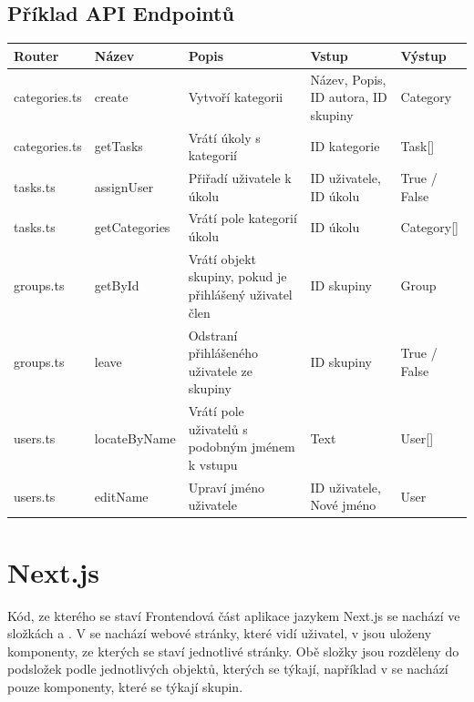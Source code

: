 \subsection{Příklad API Endpointů}
\begin{tabularx}{1\textwidth} { 
	| >{\centering\arraybackslash}X 
	| >{\centering\arraybackslash}X 
	| >{\centering\arraybackslash}X 
	| >{\centering\arraybackslash}X 
	| >{\centering\arraybackslash}X | }
	\hline
	\textbf{Router} & \textbf{Název} & \textbf{Popis}                                                  & \textbf{Vstup}                       & \textbf{Výstup} \\
	\hline
	categories.ts   & create          & Vytvoří kategorii                                             & Název, Popis, ID autora, ID skupiny & Category         \\
	\hline
	categories.ts   & getTasks        & Vrátí úkoly s kategorií                                     & ID kategorie                         & Task[]           \\
	\hline
	tasks.ts        & assignUser      & Přiřadí uživatele k úkolu                                  & ID uživatele, ID úkolu             & True / False     \\
	\hline
	tasks.ts        & getCategories   & Vrátí pole kategorií úkolu                                  & ID úkolu                            & Category[]       \\
	\hline
	groups.ts       & getById         & Vrátí objekt skupiny, pokud je přihlášený uživatel člen & ID skupiny                           & Group            \\
	\hline
	groups.ts       & leave           & Odstraní přihlášeného uživatele ze skupiny                & ID skupiny                           & True / False     \\
	\hline
	users.ts        & locateByName    & Vrátí pole uživatelů s podobným jménem k vstupu           & Text                                 & User[]           \\
	\hline
	users.ts        & editName        & Upraví jméno uživatele                                       & ID uživatele, Nové jméno          & User             \\
	\hline
\end{tabularx}
\newpage
\section{Next.js}
Kód, ze kterého se staví Frontendová část aplikace jazykem Next.js se nachází ve složkách  a . V  se nachází webové stránky, které vidí uživatel, v  jsou uloženy komponenty, ze kterých se staví jednotlivé stránky.
Obě složky jsou rozděleny do podsložek podle jednotlivých objektů, kterých se týkají, například v  se nachází pouze komponenty, které se týkají skupin.
